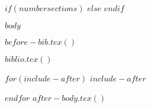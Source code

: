 

\maketitle
$if(numbersections)$
\setcounter{secnumdepth}{$if(secnumdepth)$$secnumdepth$$else$5$endif$}
$else$
\setcounter{secnumdepth}{-\maxdimen} %
$endif$

\setlength\LTleft{0pt}

$body$

$before-bib.tex()$


$biblio.tex()$

$for(include-after)$
$include-after$

$endfor$
$after-body.tex()$


